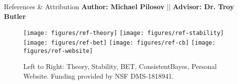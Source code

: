   \begin{block}{References \& Attribution}
    \centering
    \textbf{Author: Michael Pilosov} || \textbf{Advisor: Dr. Troy Butler}
    \begin{figure}
        \texttt{[image: figures/ref-theory]}
        \texttt{[image: figures/ref-stability]}
        \texttt{[image: figures/ref-bet]}
        \texttt{[image: figures/ref-cb]}
        \texttt{[image: figures/ref-website]}
    \caption{\centering Left to Right: Theory, Stability, BET, ConsistentBayes, Personal Website. \newline Funding provided by NSF DMS-1818941.}
    \end{figure}
   

  

  \end{block}

